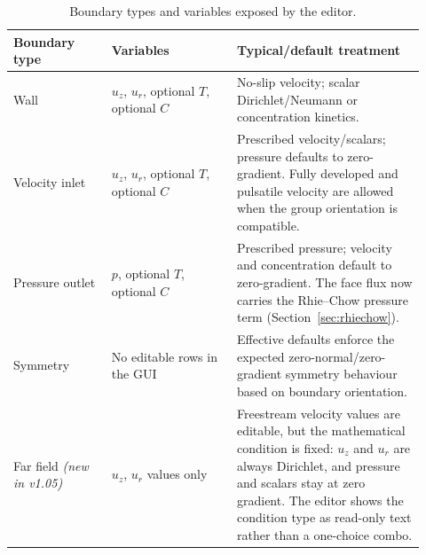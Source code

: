 \documentclass[11pt]{article}
\begin{document}
\begin{table}[h]
\centering
\caption{Boundary types and variables exposed by the editor.}
\label{tab:bc}
\begin{tabular}{@{}>{\raggedright\arraybackslash}p{0.22\linewidth}
                   >{\raggedright\arraybackslash}p{0.28\linewidth}
                   >{\raggedright\arraybackslash}p{0.42\linewidth}@{}}
\toprule
\textbf{Boundary type} & \textbf{Variables} & \textbf{Typical/default treatment} \\
\midrule
Wall & \(u_z\), \(u_r\), optional \(T\), optional \(C\)
     & No-slip velocity; scalar Dirichlet/Neumann or concentration kinetics. \\
Velocity inlet & \(u_z\), \(u_r\), optional \(T\), optional \(C\)
     & Prescribed velocity/scalars; pressure defaults to zero-gradient. Fully developed and pulsatile velocity are allowed when the group orientation is compatible. \\
Pressure outlet & \(p\), optional \(T\), optional \(C\)
     & Prescribed pressure; velocity and concentration default to zero-gradient. The face flux now carries the Rhie--Chow pressure term (Section~\ref{sec:rhiechow}). \\
Symmetry & No editable rows in the GUI
     & Effective defaults enforce the expected zero-normal/zero-gradient symmetry behaviour based on boundary orientation. \\
Far field \newline \emph{(new in v1.05)} & \(u_z\), \(u_r\) values only
     & Freestream velocity values are editable, but the mathematical condition is fixed: \(u_z\) and \(u_r\) are always Dirichlet, and pressure and scalars stay at zero gradient. The editor shows the condition type as read-only text rather than a one-choice combo. \\
\bottomrule
\end{tabular}
\end{table}
\end{document}
